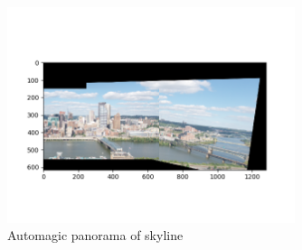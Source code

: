 \documentclass[12pt]{article}
\begin{document}
\begin{figure}[H]
\centering
\includegraphics[page=1,width=0.75\textwidth]{q4_3}
\caption{ Automagic panorama of skyline}
\label{fig:q42}
\end{figure}   
\end{document}

